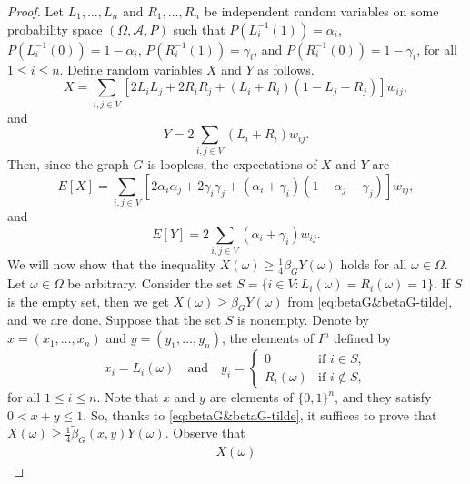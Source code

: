 \documentclass[12pt,a4paper,bold]{thesis}
\theoremstyle{definition}
\begin{document}
\begin{proof}
    Let $L_1, \dots, L_n$ and $R_1, \dots, R_n$ be independent random variables
    on some probability space $(\Omega, \mathcal{A}, P)$ such that 
    $P(L_i^{-1}(1)) = \alpha_i$, $P(L_i^{-1}(0)) = 1 - \alpha_i$, 
    $P(R_i^{-1}(1)) = \gamma_i$, and $P(R_i^{-1}(0)) = 1 - \gamma_i$, for all $1 \leq i \leq n$.
    Define random variables $X$ and $Y$ as follows.
    \begin{equation*}
        X = \sum_{i,j \in V} [2 L_i L_j + 2 R_i R_j + (L_i + R_i)(1 - L_j - R_j)] w_{ij},
    \end{equation*}   
    and
    \begin{equation*} 
        Y = 2 \sum_{i,j \in V} (L_i + R_i) w_{ij}.
    \end{equation*}
    Then, since the graph $G$ is loopless, the expectations of $X$ and $Y$ are
    \begin{equation*}
        E[X] = \sum_{i,j \in V} [2 \alpha_i \alpha_j + 2 \gamma_i \gamma_j 
        + (\alpha_i + \gamma_i)(1 - \alpha_j -\gamma_j)] w_{ij},
    \end{equation*}
    and
    \begin{equation*}
        E[Y] = 2 \sum_{i,j \in V} (\alpha_i + \gamma_i) w_{ij}. 
    \end{equation*}
    We will now show that the inequality $X(\omega) \geq \frac{1}{4} \beta_G Y(\omega)$
    holds for all $\omega \in \Omega$. Let $\omega \in \Omega$ be arbitrary.
    Consider the set $S = \{i \in V : L_i(\omega) = R_i(\omega) = 1\}$. 
    If $S$ is the empty set, then we get $X(\omega) \geq \beta_G Y(\omega)$
    from \cref{eq:betaG&betaG-tilde}, and we are done. Suppose that the set $S$ is nonempty.
    Denote by $x = (x_1, \dots, x_n)$ and $y = (y_1, \dots, y_n)$, the elements of $I^n$
    defined by 
    \begin{equation*}
        x_i = L_i(\omega) \quad \text{and} \quad y_i = 
        \begin{cases}
            0 & \text{if } i \in S,
            \\
            R_i(\omega) & \text{if } i \notin S,
        \end{cases} 
    \end{equation*}
    for all $1 \leq i \leq n$. Note that $x$ and $y$ are elements of $\{0,1\}^n$, 
    and they satisfy $0 < x + y \leq 1$. So, thanks to \cref{eq:betaG&betaG-tilde}, 
    it suffices to prove that $X(\omega) \geq \frac{1}{4} \tilde \beta_G(x,y) Y(\omega)$.
    Observe that
    \begin{align*}
        X(\omega) 

\end{align*}
\end{proof}
\end{document}
